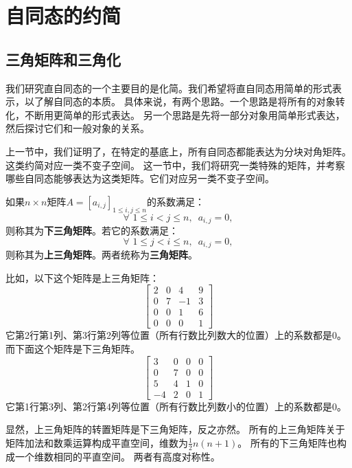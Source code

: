 \documentclass[12pt,UTF8]{ctexbook}
\begin{document}
\section{自同态的约简}
\subsection{三角矩阵和三角化}
我们研究直自同态的一个主要目的是化简。我们希望将直自同态用简单的形式表示，以了解自同态的本质。
具体来说，有两个思路。一个思路是将所有的对象转化，不断用更简单的形式表达。
另一个思路是先将一部分对象用简单形式表达，然后探讨它们和一般对象的关系。

上一节中，我们证明了，在特定的基底上，所有自同态都能表达为分块对角矩阵。这类约简对应一类不变子空间。
这一节中，我们将研究一类特殊的矩阵，并考察哪些自同态能够表达为这类矩阵。它们对应另一类不变子空间。

\begin{df}\label{df:6_3}
    如果$n\times n$矩阵$A = [a_{i,j}]_{1 \leqslant i , j \leqslant n}$的系数满足：
    $$ \forall \,\, 1 \leqslant i < j \leqslant n, \,\,\, a_{i,j} = 0,$$
    则称其为\textbf{下三角矩阵}。若它的系数满足：
    $$ \forall \,\, 1 \leqslant j < i \leqslant n, \,\,\, a_{i,j} = 0,$$
    则称其为\textbf{上三角矩阵}。两者统称为\textbf{三角矩阵}。
\end{df}

比如，以下这个矩阵是上三角矩阵：
$$ \begin{bmatrix} 2 & 0 & 4 & 9 \\ 0 & 7 & -1 & 3 \\ 0 & 0 & 1 & 6 \\ 0 & 0 & 0 & 1\end{bmatrix}$$
它第2行第1列、第3行第2列等位置（所有行数比列数大的位置）上的系数都是0。而下面这个矩阵是下三角矩阵。
$$ \begin{bmatrix} 3 & 0 & 0 & 0 \\ 0 & 7 & 0 & 0 \\ 5 & 4 & 1 & 0 \\ -4 & 2 & 0 & 1\end{bmatrix}$$
    它第1行第3列、第2行第4列等位置（所有行数比列数小的位置）上的系数都是0。

显然，上三角矩阵的转置矩阵是下三角矩阵，反之亦然。
所有的上三角矩阵关于矩阵加法和数乘运算构成平直空间，维数为$\frac12 n(n+1)$。
所有的下三角矩阵也构成一个维数相同的平直空间。
两者有高度对称性。
\end{document}
